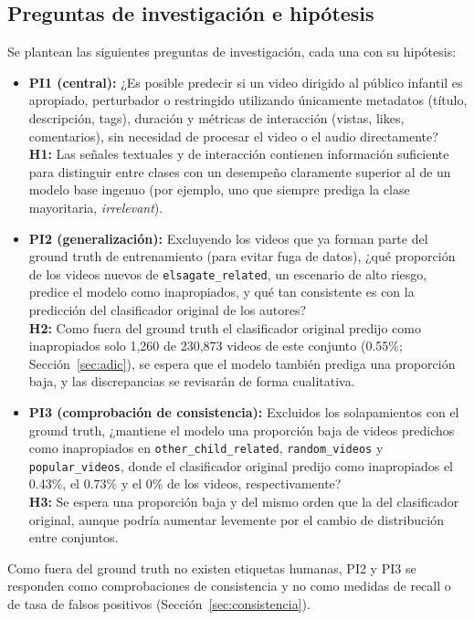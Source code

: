 \documentclass[conference]{IEEEtran}
\begin{document}
\subsection{Preguntas de investigación e hipótesis}
Se plantean las siguientes preguntas de investigación, cada una con su hipótesis:
\begin{itemize}
\item \textbf{PI1 (central):} ¿Es posible predecir si un video dirigido al público infantil es apropiado, perturbador o restringido utilizando únicamente metadatos (título, descripción, tags), duración y métricas de interacción (vistas, likes, comentarios), sin necesidad de procesar el video o el audio directamente?\\
\textbf{H1:} Las señales textuales y de interacción contienen información suficiente para distinguir entre clases con un desempeño claramente superior al de un modelo base ingenuo (por ejemplo, uno que siempre prediga la clase mayoritaria, \textit{irrelevant}).
\item \textbf{PI2 (generalización):} Excluyendo los videos que ya forman parte del ground truth de entrenamiento (para evitar fuga de datos), ¿qué proporción de los videos nuevos de \texttt{elsagate\_related}, un escenario de alto riesgo, predice el modelo como inapropiados, y qué tan consistente es con la predicción del clasificador original de los autores?\\
\textbf{H2:} Como fuera del ground truth el clasificador original predijo como inapropiados solo 1,260 de 230,873 videos de este conjunto (0.55\%; Sección~\ref{sec:adic}), se espera que el modelo también prediga una proporción baja, y las discrepancias se revisarán de forma cualitativa.
\item \textbf{PI3 (comprobación de consistencia):} Excluidos los solapamientos con el ground truth, ¿mantiene el modelo una proporción baja de videos predichos como inapropiados en \texttt{other\_child\_related}, \texttt{random\_videos} y \texttt{popular\_videos}, donde el clasificador original predijo como inapropiados el 0.43\%, el 0.73\% y el 0\% de los videos, respectivamente?\\
\textbf{H3:} Se espera una proporción baja y del mismo orden que la del clasificador original, aunque podría aumentar levemente por el cambio de distribución entre conjuntos.
\end{itemize}
Como fuera del ground truth no existen etiquetas humanas, PI2 y PI3 se responden como comprobaciones de consistencia y no como medidas de recall o de tasa de falsos positivos (Sección~\ref{sec:consistencia}).
\end{document}
